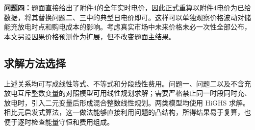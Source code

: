 \indent\textbf{问题四：}题面直接给出了附件4的全年实时电价，因此正式重算以附件4电价为已给数据，将其替换问题二、三中的典型日电价即可。这样可以单独观察价格波动对储能充放电时点和购电成本的影响。考虑真实市场中未来价格未必一次性全部公布，本文另设因果价格预测作为扩展，但不改变题面主结果。

\subsection{求解方法选择}

上述关系均可写成线性等式、不等式和分段线性费用。问题一、问题二以及不含充放电互斥整数变量的对照模型可用线性规划求解；需要严格禁止同一时段同时充、放电时，引入二元变量后形成混合整数线性规划。两类模型均使用 HiGHS 求解。相比元启发式算法，这一做法能够直接利用问题的凸结构，所得结果易于复算，也便于逐时检查能量守恒和费用组成。
